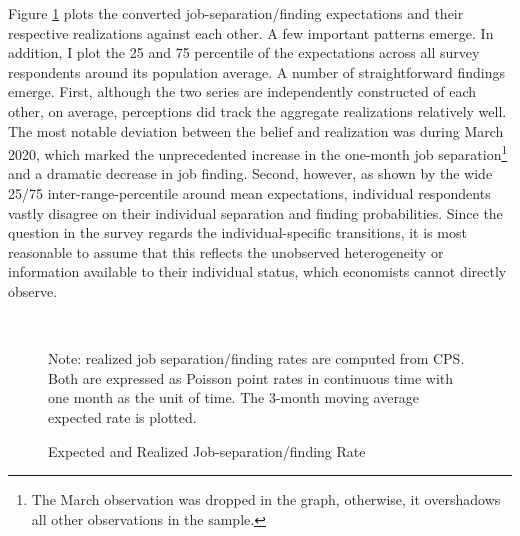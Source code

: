 Figure \ref{fig:srate_compare} plots the converted job-separation/finding expectations and their respective realizations against each other. A few important patterns emerge. In addition, I plot the 25 and 75 percentile of the expectations across all survey respondents around its population average. A number of straightforward findings emerge. First, although the two series are independently constructed of each other, on average, perceptions did track the aggregate realizations relatively well. The most notable deviation between the belief and realization was during March 2020, which marked the unprecedented increase in the one-month job separation\footnote{The March observation was dropped in the graph, otherwise, it overshadows all other observations in the sample.} and a dramatic decrease in job finding. Second, however, as shown by the wide 25/75 inter-range-percentile around mean expectations, individual respondents vastly disagree on their individual separation and finding probabilities. Since the question in the survey regards the individual-specific transitions, it is most reasonable to assume that this reflects the unobserved heterogeneity or information available to their individual status, which economists cannot directly observe. 

 \begin{figure}[!ht]
      \caption{Expected and Realized Job-separation/finding Rate}
    \label{fig:srate_compare}
    	\begin{center} \\
    	\medskip
    	\end{center}
    \begin{flushleft}Note: realized job separation/finding rates are computed from CPS. Both are expressed as Poisson point rates in continuous time with one month as the unit of time. The 3-month moving average expected rate is plotted.\end{flushleft}
    \end{figure}
    

